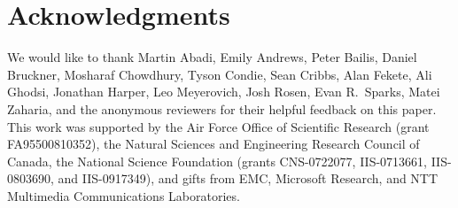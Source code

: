 \section*{Acknowledgments}
We would like to thank Martin Abadi, Emily Andrews, Peter Bailis, Daniel
Bruckner, Mosharaf Chowdhury, Tyson Condie, Sean Cribbs, Alan Fekete, Ali
Ghodsi, Jonathan Harper, Leo Meyerovich, Josh Rosen, Evan R.\ Sparks, Matei
Zaharia, and the anonymous reviewers for their helpful feedback on this paper.
This work was supported by the Air Force Office of Scientific Research (grant
FA95500810352), the Natural Sciences and Engineering Research Council of Canada,
the National Science Foundation (grants CNS-0722077, IIS-0713661, IIS-0803690,
and IIS-0917349), and gifts from EMC, Microsoft Research, and NTT Multimedia
Communications Laboratories.
